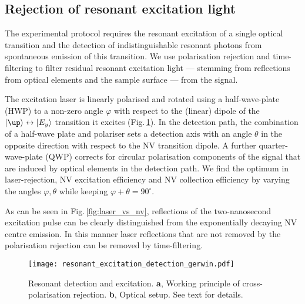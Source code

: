 \subsection{Rejection of resonant excitation light}
The experimental protocol requires the resonant excitation of a single optical transition and the detection of indistinguishable resonant photons from spontaneous emission of this transition. We use polarisation rejection and time-filtering to filter residual resonant excitation light --- stemming from reflections from optical elements and the sample surface --- from the signal.

The excitation laser is linearly polarised and rotated using a half-wave-plate (HWP) to a non-zero angle $\varphi$  with respect to the (linear) dipole of the $\ket{\up}\leftrightarrow\ket{E_y}$ transition it excites (Fig.\,\ref{fig:resonant_detection}). In the detection path, the combination of a half-wave plate and polariser sets a detection axis with an angle $\theta$ in the opposite direction with respect to the NV transition dipole. A further quarter-wave-plate (QWP) corrects for circular polarisation components of the signal that are induced by optical elements in the detection path.  We find the optimum in laser-rejection, NV excitation efficiency and NV collection efficiency by varying the angles $\varphi,\theta$ while keeping $\varphi + \theta = 90^\circ$.

As can be seen in Fig.\,\ref{fig:laser_vs_nv}, reflections of the two-nanosecond excitation pulse can be clearly distinguished from the exponentially decaying NV centre emission. In this manner laser reflections that are not removed by the polarisation rejection can be removed by time-filtering. %
\begin{figure}[h]
\centering
\texttt{[image: resonant\_excitation\_detection\_gerwin.pdf]}
\caption{Resonant detection and excitation. {\bf a}, Working principle of cross-polarisation rejection. {\bf b}, Optical setup. See text for details.}
\label{fig:resonant_detection}
\end{figure}

